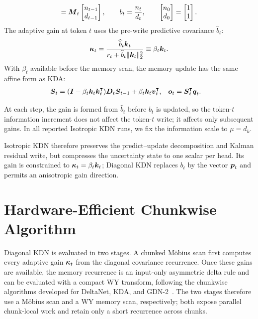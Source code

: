 \documentclass{article} %
\begin{document}
\begin{tcolorbox}
\begin{equation}
  =
  \boldsymbol{M}_t
  \begin{bmatrix}n_{t-1}\\ d_{t-1}\end{bmatrix},
  \qquad
  b_t=\frac{n_t}{d_t},
  \qquad
  \begin{bmatrix}n_0\\ d_0\end{bmatrix}
  =
  \begin{bmatrix}1\\ 1\end{bmatrix}.
  \label{eq:iso-kla-box-mobius}
\end{equation}
The adaptive gain at token $t$ uses the pre-write predictive covariance $\widehat b_t$:
\begin{equation}
  \boldsymbol{\kappa}_t
  =\frac{\widehat b_t\boldsymbol{k}_t}
    {r_t+\widehat b_t\|\boldsymbol{k}_t\|_2^2}
  \equiv\beta_t\boldsymbol{k}_t.
\label{eq:iso-kla-box-gain}
\end{equation}
With $\beta_t$ available before the memory scan, the memory update has the same affine form as KDA:
\begin{equation}
\begin{aligned}
  \boldsymbol{S}_t
  &=(\boldsymbol{I}-\beta_t\boldsymbol{k}_t\boldsymbol{k}_t^{\intercal})\boldsymbol{D}_t\boldsymbol{S}_{t-1}
    +\beta_t\boldsymbol{k}_t\boldsymbol{v}_t^{\intercal},
  &
  \boldsymbol{o}_t &= \boldsymbol{S}_t^{\intercal}\boldsymbol{q}_t .
\end{aligned}
  \label{eq:iso-kla-box-memory}
\end{equation}
\end{tcolorbox}

At each step, the gain is formed from $\widehat b_t$ before $b_t$ is updated, so the token-$t$
information increment does not affect the token-$t$ write; it affects only subsequent gains.
In all reported Isotropic KDN runs, we fix the information scale to $\mu=d_k$.

Isotropic KDN therefore preserves the predict--update decomposition and Kalman residual write, but
compresses the uncertainty state to one scalar per head. Its gain is constrained to
$\boldsymbol{\kappa}_t=\beta_t\boldsymbol{k}_t$; Diagonal KDN replaces $b_t$ by the vector $\boldsymbol{p}_t$ and permits
an anisotropic gain direction.

\section{Hardware-Efficient Chunkwise Algorithm}
\label{sec:chunkwise-algorithm}

Diagonal KDN is evaluated in two stages. A chunked M\"obius scan first computes every adaptive
gain $\boldsymbol{\kappa}_t$ from the diagonal covariance recurrence. Once these gains are available,
the memory recurrence is an input-only asymmetric delta rule and can be evaluated with a compact
WY transform, following the chunkwise algorithms developed for DeltaNet, KDA, and
GDN-2~\citep{yang2024parallelizing,kimiteam2025kimilinear,hatamizadeh2026gdn2}. The two stages
therefore use a M\"obius scan and a WY memory scan, respectively; both expose parallel
chunk-local work and retain only a short recurrence across chunks.
\end{document}
